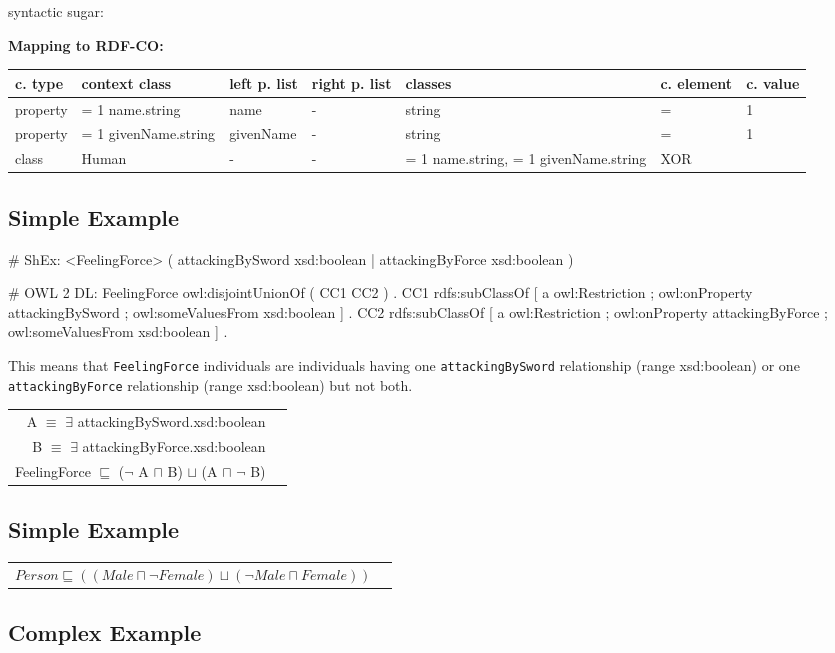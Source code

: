 \documentclass{llncs}
\newcommand{\ms}[1]{\texttt{#1}}
\newenvironment{gcotable}{
  \scriptsize
  \sffamily
  \vspace{0cm}
	\begin{center}
	\textbf{\vspace{0.4cm}Mapping to RDF-CO:} \\
  \begin{tabular}{l|l|l|l|l|l|l}
	\hline
  \textbf{c. type} & \textbf{context class} & \textbf{left p. list} & \textbf{right p. list} & \textbf{classes} & \textbf{c. element} & \textbf{c. value} \\
  \hline

}{
  \hline
  \end{tabular}
	\end{center}
}
\newenvironment{DL}{
  \vspace{0cm}
	\begin{center}
  \begin{tabular}{r l}

}{
  \end{tabular}
	\end{center}
}
\begin{document}
syntactic sugar:
\begin{gcotable}
property & = 1 name.string & name & - & string & = & 1 \\
property & = 1 givenName.string & givenName & - & string & = & 1 \\
class & Human & - & - & = 1 name.string, = 1 givenName.string & XOR \\
\end{gcotable}

\subsection{Simple Example}

\begin{ex}
# ShEx:
<FeelingForce> { (  
    attackingBySword xsd:boolean | 
    attackingByForce xsd:boolean ) }
\end{ex}

\begin{ex}
# OWL 2 DL:
FeelingForce owl:disjointUnionOf ( CC1 CC2 ) . 
CC1 rdfs:subClassOf [
    a owl:Restriction ;
    owl:onProperty attackingBySword ;
    owl:someValuesFrom xsd:boolean ] .
CC2 rdfs:subClassOf [
    a owl:Restriction ;
    owl:onProperty attackingByForce ;
    owl:someValuesFrom xsd:boolean ] .
\end{ex}

This means that \ms{FeelingForce} individuals are individuals having one \ms{attackingBySword} relationship (range xsd:boolean) or one \ms{attackingByForce} relationship (range xsd:boolean) but not both.

\begin{DL}
A $\equiv$ $\exists$ attackingBySword.xsd:boolean \\
B $\equiv$ $\exists$ attackingByForce.xsd:boolean \\ 
FeelingForce $\sqsubseteq$ ($\neg$ A $\sqcap$ B) $\sqcup$ (A $\sqcap$ $\neg$ B) \\
\end{DL}

\subsection{Simple Example}

\begin{DL}
$Person \sqsubseteq ((Male \sqcap \neg Female) \sqcup (\neg Male \sqcap  Female)) $ 
\end{DL}

\subsection{Complex Example}
\end{document}

